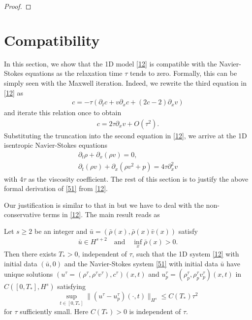 \documentclass{article}
\theoremstyle{plain}
\begin{document}
\begin{proof}
\end{proof}
\section{Compatibility
}
\setcounter{equation}{0}

In this section, we show that the 1D model \eqref{12} is compatible with the Navier-Stokes equations as the relaxation time $\tau$ tends to zero. Formally, this can be simply seen with the Maxwell iteration. Indeed, we rewrite the third equation in \eqref{12} as
\begin{eqnarray*}
  c= -\tau(\partial_t c + v \partial_x c + (2c-2) \partial_x v)
\end{eqnarray*}
and iterate this relation once to obtain
\begin{eqnarray*}
  c = 2 \tau \partial_x v + O(\tau^2).
\end{eqnarray*}
Substituting the truncation into the second equation in \eqref{12},
we arrive at the 1D isentropic Navier-Stokes equations
  \begin{align}\label{51}
  \partial_t \rho + \partial_x (\rho v ) = 0, \nonumber \\
  \partial_t (\rho v) + \partial_x( \rho v^2 + p) = 4 \tau \partial^2_x v
\end{align}
with $4\tau$ as the viscosity coefficient. The rest of this section is to justify the above formal derivation of \eqref{51} from \eqref{12}.

Our justification is similar to that in \cite{yang2015validity} but we have to deal with the non-conservative terms in \eqref{12}. The main result reads as

\begin{thm}\label{theoremCE}
Let $s \ge 2$ be an integer and ${\bar u} =({\bar \rho}(x),\bar{\rho}(x){\bar v}(x))$ satisfy
  \begin{eqnarray*}
    \bar{u}\in H^{s+2} \quad  \mbox{and} \quad \inf_{x} \bar{\rho}(x)>0.
 \end{eqnarray*}
Then there exists $T_*>0$, independent of $\tau$, such that the 1D system \eqref{12} with initial data $(\bar{u},0)$ and the Navier-Stokes system \eqref{51} with initial data ${\bar u}$ have unique solutions $(u^\tau=(\rho^\tau,\rho^\tau v^\tau), c^\tau)(x,t)$ and $u^\tau_p=(\rho^\tau_p,\rho^\tau_p v^\tau_p)(x,t)$ in $C([0,T_*], H^s)$ satisfying
  \begin{equation}\label{52}
    \sup_{t \in [0, T_*]} \|(u^\tau-u^\tau_p)(\cdot,t)\|_{H^s} \le C(T_*) \tau^2
  \end{equation}
  for $\tau$ sufficiently small. Here $C(T_*)>0$ is independent of $\tau$.
\end{thm}
\end{document}
